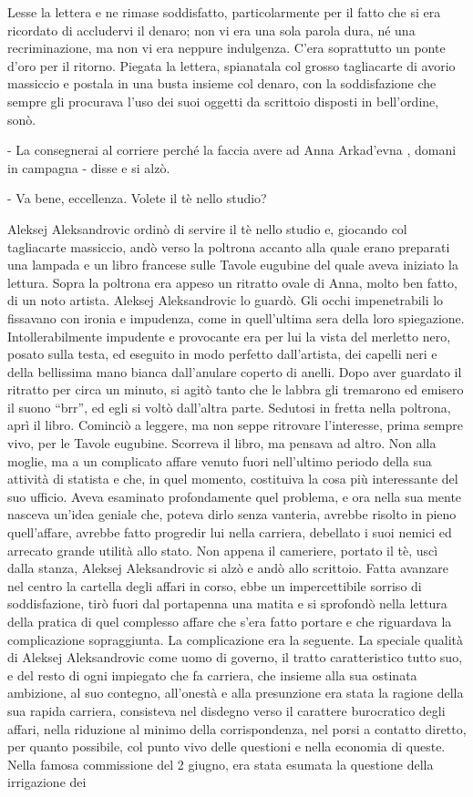 Lesse la lettera e ne rimase soddisfatto, particolarmente per il fatto che si era ricordato di accludervi il denaro; non vi era una sola parola dura, né una recriminazione, ma non vi era neppure indulgenza. C'era soprattutto un ponte d'oro per il ritorno. Piegata la lettera, spianatala col grosso tagliacarte di avorio massiccio e postala in una busta insieme col denaro, con la soddisfazione che sempre gli procurava l'uso dei suoi oggetti da scrittoio disposti in bell'ordine, sonò. 

- La consegnerai al corriere perché la faccia avere ad Anna Arkad'evna , domani in campagna - disse e si alzò. 

- Va bene, eccellenza. Volete il tè nello studio? 

Aleksej Aleksandrovic ordinò di servire il tè nello studio e, giocando col tagliacarte massiccio, andò verso la poltrona accanto alla quale erano preparati una lampada e un libro francese sulle Tavole eugubine del quale aveva iniziato la lettura. Sopra la poltrona era appeso un ritratto ovale di Anna, molto ben fatto, di un noto artista. Aleksej Aleksandrovic lo guardò. Gli occhi impenetrabili lo fissavano con ironia e impudenza, come in quell'ultima sera della loro spiegazione. Intollerabilmente impudente e provocante era per lui la vista del merletto nero, posato sulla testa, ed eseguito in modo perfetto dall'artista, dei capelli neri e della bellissima mano bianca dall'anulare coperto di anelli. Dopo aver guardato il ritratto per circa un minuto, si agitò tanto che le labbra gli tremarono ed emisero il suono ``brr'', ed egli si voltò dall'altra parte. Sedutosi in fretta nella poltrona, aprì il libro. Cominciò a leggere, ma non seppe ritrovare l'interesse, prima sempre vivo, per le Tavole eugubine. Scorreva il libro, ma pensava ad altro. Non alla moglie, ma a un complicato affare venuto fuori nell'ultimo periodo della sua attività di statista e che, in quel momento, costituiva la cosa più interessante del suo ufficio. Aveva esaminato profondamente quel problema, e ora nella sua mente nasceva un'idea geniale che, poteva dirlo senza vanteria, avrebbe risolto in pieno quell'affare, avrebbe fatto progredir lui nella carriera, debellato i suoi nemici ed arrecato grande utilità allo stato. Non appena il cameriere, portato il tè, uscì dalla stanza, Aleksej Aleksandrovic si alzò e andò allo scrittoio. Fatta avanzare nel centro la cartella degli affari in corso, ebbe un impercettibile sorriso di soddisfazione, tirò fuori dal portapenna una matita e si sprofondò nella lettura della pratica di quel complesso affare che s'era fatto portare e che riguardava la complicazione sopraggiunta. La complicazione era la seguente. La speciale qualità di Aleksej Aleksandrovic come uomo di governo, il tratto caratteristico tutto suo, e del resto di ogni impiegato che fa carriera, che insieme alla sua ostinata ambizione, al suo contegno, all'onestà e alla presunzione era stata la ragione della sua rapida carriera, consisteva nel disdegno verso il carattere burocratico degli affari, nella riduzione al minimo della corrispondenza, nel porsi a contatto diretto, per quanto possibile, col punto vivo delle questioni e nella economia di queste. Nella famosa commissione del 2 giugno, era stata esumata la questione della irrigazione dei 